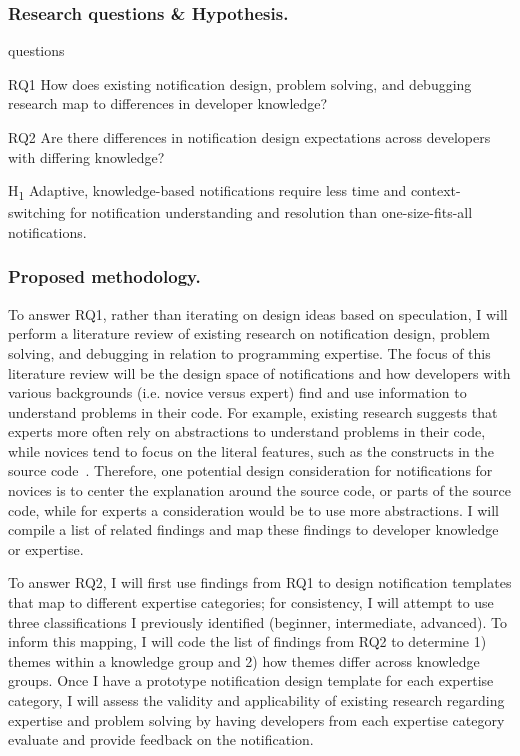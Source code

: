 \documentclass{llncs}
\begin{document}
\subsubsection{Research questions \& Hypothesis.}

\begin{labeling}{questions}
	\item [RQ1] How does existing notification design, problem solving, and debugging research map to differences in developer knowledge?
	\item [RQ2] Are there differences in notification design expectations across developers with differing knowledge?
	\item [H\textsubscript{1}] Adaptive, knowledge-based notifications require less time and context-switching for notification understanding and resolution than one-size-fits-all notifications.
\end{labeling}

\subsubsection{Proposed methodology.}
To answer RQ1, rather than iterating on design ideas based on speculation, I will perform a literature review of existing research on notification design, problem solving, and debugging in relation to programming expertise. The focus of this literature review will be the design space of notifications and how developers with various backgrounds (i.e. novice versus expert) find and use information to understand problems in their code. For example, existing research suggests that experts more often rely on abstractions to understand problems in their code, while novices tend to focus on the literal features, such as the constructs in the source code~\cite{Weiser:1983:Representation}. Therefore, one potential design consideration for notifications for novices is to center the explanation around the source code, or parts of the source code, while for experts a consideration would be to use more abstractions. I will compile a list of related findings and map these findings to developer knowledge or expertise.

To answer RQ2, I will first use findings from RQ1 to design notification templates that map to different expertise categories; for consistency, I will attempt to use three classifications I previously identified (beginner, intermediate, advanced).
To inform this mapping, I will code the list of findings from RQ2 to determine 1) themes within a knowledge group and 2) how themes differ across knowledge groups.
Once I have a prototype notification design template for each expertise category, I will assess the validity and applicability of existing research regarding expertise and problem solving by having developers from each expertise category evaluate and provide feedback on the notification. 
\end{document}
